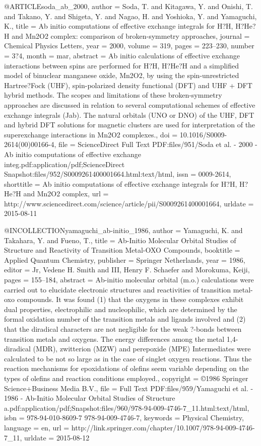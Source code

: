 @ARTICLE{soda_ab_2000,
  author = {Soda, T. and Kitagawa, Y. and Onishi, T. and Takano, Y. and Shigeta,
	Y. and Nagao, H. and Yoshioka, Y. and Yamaguchi, K.},
  title = {Ab initio computations of effective exchange integrals for {H}?{H},
	{H}?{He}?{H} and {Mn}2O2 complex: comparison of broken-symmetry approaches},
  journal = {Chemical Physics Letters},
  year = {2000},
  volume = {319},
  pages = {223--230},
  number = {3?4},
  month = mar,
  abstract = {Ab initio calculations of effective exchange interactions between
	spins are performed for H?H, H?He?H and a simplified model of binuclear
	manganese oxide, Mn2O2, by using the spin-unrestricted Hartree?Fock
	(UHF), spin-polarized density functional (DFT) and UHF + DFT hybrid
	methods. The scopes and limitations of these broken-symmetry approaches
	are discussed in relation to several computational schemes of effective
	exchange integrals (Jab). The natural orbitals (UNO or DNO) of the
	UHF, DFT and hybrid DFT solutions for magnetic clusters are used
	for interpretation of the superexchange interactions in Mn2O2 complexes.},
  doi = {10.1016/S0009-2614(00)00166-4},
  file = {ScienceDirect Full Text PDF:files/951/Soda et al. - 2000 - Ab initio computations of effective  exchange integ.pdf:application/pdf;ScienceDirect Snapshot:files/952/S0009261400001664.html:text/html},
  issn = {0009-2614},
  shorttitle = {Ab initio computations of effective exchange integrals for {H}?{H},
	{H}?{He}?{H} and {Mn}2O2 complex},
  url = {http://www.sciencedirect.com/science/article/pii/S0009261400001664},
  urldate = {2015-08-11}
}

@INCOLLECTION{yamaguchi_ab-initio_1986,
  author = {Yamaguchi, K. and Takahara, Y. and Fueno, T.},
  title = {Ab-{Initio} {Molecular} {Orbital} {Studies} of {Structure} and {Reactivity}
	of {Transition} {Metal}-{OXO} {Compounds}},
  booktitle = {Applied {Quantum} {Chemistry}},
  publisher = {Springer Netherlands},
  year = {1986},
  editor = {Jr, Vedene H. Smith and III, Henry F. Schaefer and Morokuma, Keiji},
  pages = {155--184},
  abstract = {Ab-initio molecular orbital (m.o.) calculations were carried out to
	elucidate electronic structures and reactivities of transition metal-oxo
	compounds. It was found (1) that the oxygens in these complexes exhibit
	dual properties, electrophilic and nucleophilic, which are determined
	by the formal oxidation number of the transition metals and ligands
	involved and (2) that the diradical characters are not negligible
	for the weak ?-bonds between transition metals and oxygens. The energy
	differences among the metal 1,4-diradical (MDR), zwitterion (MZW)
	and perepoxide (MPE) Intermediates were calculated to be not so large
	as in the case of singlet oxygen reactions. Thus the reaction mechanisms
	for epoxidations of olefins seem variable depending on the types
	of olefins and reaction conditions employed.},
  copyright = {©1986 Springer Science+Business Media B.V.},
  file = {Full Text PDF:files/959/Yamaguchi et al. - 1986 - Ab-Initio Molecular Orbital Studies of         Structure a.pdf:application/pdf;Snapshot:files/960/978-94-009-4746-7_11.html:text/html},
  isbn = {978-94-010-8609-7 978-94-009-4746-7},
  keywords = {Physical Chemistry},
  language = {en},
  url = {http://link.springer.com/chapter/10.1007/978-94-009-4746-7_11},
  urldate = {2015-08-12}
}


